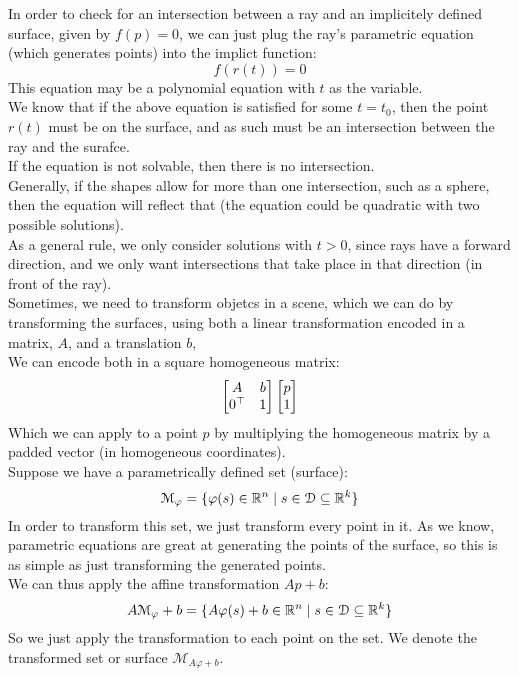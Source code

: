 \documentclass[12pt]{article}
\begin{document}
In order to check for an intersection between
a ray and an implicitely defined surface,
given by $f(p) = 0$,
we can just plug the ray's parametric equation
(which generates points) into the implict function:
\[ f(r(t)) = 0 \]
This equation may be a polynomial equation with $t$
as the variable. \\
We know that if the above equation is satisfied
for some $t = t_0$, then the point $r(t)$
must be on the surface, and as such must be
an intersection between the ray and the surafce. \\
If the equation is not solvable, then there
is no intersection. \\
Generally, if the shapes allow for more than one
intersection, such as a sphere, then the equation
will reflect that (the equation could be
quadratic with two possible solutions). \\

As a general rule, we only consider solutions
with $t > 0$, since rays have a forward direction,
and we only want intersections that take place
in that direction (in front of the ray). \\

Sometimes, we need to transform objetcs in a
scene, which we can do by transforming the surfaces,
using both a linear transformation encoded in
a matrix, $A$, and a translation $b$, \\
We can encode both in a square homogeneous matrix:
\[ \begin{bmatrix} A & b \\ 0^\top & 1 \end{bmatrix} \begin{bmatrix} p \\ 1 \end{bmatrix} \]
Which we can apply to a point $p$ by multiplying
the homogeneous matrix by a padded vector
(in homogeneous coordinates). \\

Suppose we have
a parametrically defined set (surface):
\[ \mathcal{M}_\varphi = 
\{ \varphi(s) \in \mathbb{R}^n \mid 
s \in \mathcal{D} \subseteq \mathbb{R}^k \} \]
In order to transform this set,
we just transform every point in it.
As we know, parametric equations are great at
generating the points of the surface,
so this is as simple as just transforming the
generated points. \\
We can thus apply the affine transformation $Ap + b$:
\[ A\mathcal{M}_\varphi + b
= \{ A\varphi(s) + b\in \mathbb{R}^n \mid 
s \in \mathcal{D} \subseteq \mathbb{R}^k \} \]
So we just apply the transformation
to each point on the set.
We denote the transformed set or surface
$\mathcal{M}_{A\varphi + b}$. \\
\end{document}
